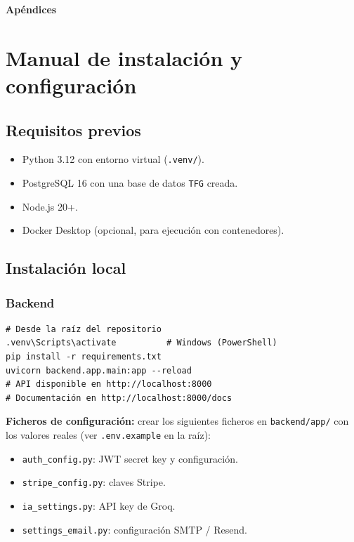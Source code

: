 \documentclass[12pt,twoside,titlepage]{report}
\begin{document}
\appendix

{}

\mbox{}
\vfill
\begin{center}
\begin{Huge}
\textbf{Apéndices}
\end{Huge}
\end{center}
\vfill
\mbox{}
\thispagestyle{empty}

\newpage
\mbox{}
\thispagestyle{empty}
\newpage


\chapter{Manual de instalación y configuración}
\label{apx:instalacion}

\section{Requisitos previos}

\begin{itemize}[nosep]
  \item Python 3.12 con entorno virtual (\texttt{.venv/}).
  \item PostgreSQL 16 con una base de datos \texttt{TFG} creada.
  \item Node.js 20+.
  \item Docker Desktop (opcional, para ejecución con contenedores).
\end{itemize}

\section{Instalación local}

\subsection{Backend}

\begin{verbatim}
# Desde la raíz del repositorio
.venv\Scripts\activate          # Windows (PowerShell)
pip install -r requirements.txt
uvicorn backend.app.main:app --reload
# API disponible en http://localhost:8000
# Documentación en http://localhost:8000/docs
\end{verbatim}

\textbf{Ficheros de configuración:} crear los siguientes ficheros en \texttt{backend/app/} con los valores reales (ver \texttt{.env.example} en la raíz):
\begin{itemize}[nosep]
  \item \texttt{auth\_config.py}: JWT secret key y configuración.
  \item \texttt{stripe\_config.py}: claves Stripe.
  \item \texttt{ia\_settings.py}: API key de Groq.
  \item \texttt{settings\_email.py}: configuración SMTP / Resend.
\end{itemize}
\end{document}
